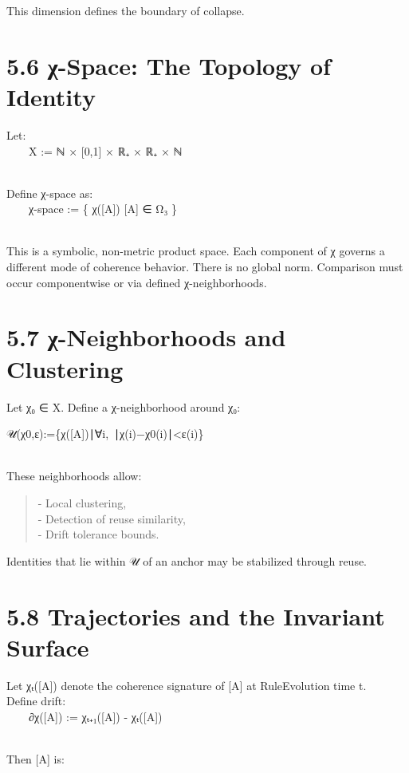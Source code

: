 This dimension defines the boundary of collapse.

\section{5.6 \textbar{} χ-Space: The Topology of
Identity}\label{ux3c7-space-the-topology-of-identity}

Let:\\
  X := ℕ × {[}0,1{]} × ℝ₊ × ℝ₊ × ℕ\\
\strut \\
Define χ-space as:\\
  χ-space := \{ χ({[}A{]}) \textbar{} {[}A{]} ∈ Ω₃ \}\\
\strut \\
This is a symbolic, non-metric product space. Each component of χ
governs a different mode of coherence behavior. There is no global norm.
Comparison must occur componentwise or via defined χ-neighborhoods.

\section{5.7 \textbar{} χ-Neighborhoods and
Clustering}\label{ux3c7-neighborhoods-and-clustering}

Let χ₀ ∈ X. Define a χ-neighborhood around χ₀:

𝒰(χ0\hspace{0pt},ε):=\{χ({[}A{]})∣∀i,~∣χ(i)−χ0(i)\hspace{0pt}∣\textless ε(i)\}\\
\strut \\
These neighborhoods allow:

\begin{quote}
- Local clustering,\\
- Detection of reuse similarity,\\
- Drift tolerance bounds.
\end{quote}

Identities that lie within 𝒰 of an anchor may be stabilized through
reuse.

\section{5.8 \textbar{} Trajectories and the Invariant
Surface}\label{trajectories-and-the-invariant-surface}

Let χₜ({[}A{]}) denote the coherence signature of {[}A{]} at
RuleEvolution time t.\\
Define drift:\\
  ∂χ({[}A{]}) := χₜ₊₁({[}A{]}) - χₜ({[}A{]})\\
\strut \\
Then {[}A{]} is:

